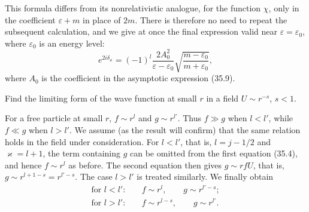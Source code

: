 This formula differs from its nonrelativistic analogue, for the function $\chi$, only in the coefficient $\varepsilon+m$ in place of $2m$. There is therefore no need to repeat the subsequent calculation, and we give at once the final expression valid near $\varepsilon=\varepsilon_0$, where $\varepsilon_0$ is an energy level:
\begin{equation}
e^{2i\delta_\varkappa}=(-1)^l\frac{2A_0^2}{\varepsilon-\varepsilon_0}
\sqrt{\frac{m-\varepsilon_0}{m+\varepsilon_0}},
\tag{35.11}
\end{equation}
where $A_0$ is the coefficient in the asymptotic expression (35.9).

\ProblemHeading

Find the limiting form of the wave function at small $r$ in a field $U\sim r^{-s}$, $s<1$.

\SolutionHeading For a free particle at small $r$, $f\sim r^l$ and $g\sim r^{l'}$. Thus $f\gg g$ when $l<l'$, while $f\ll g$ when $l>l'$. We assume
(as the result will confirm) that the same relation holds in the field under consideration. For $l<l'$, that is, $l=j-1/2$ and $\varkappa=l+1$, the term containing $g$ can be omitted from the first equation (35.4), and hence $f\sim r^l$ as before. The second equation then gives $g\sim rfU$, that is, $g\sim r^{l+1-s}=r^{l'-s}$. The case $l>l'$ is treated similarly. We finally obtain
\[
\begin{aligned}
\text{for }l<l':&\quad f\sim r^l,\qquad g\sim r^{l'-s};\\
\text{for }l>l':&\quad f\sim r^{l-s},\qquad g\sim r^{l'}.
\end{aligned}
\]
